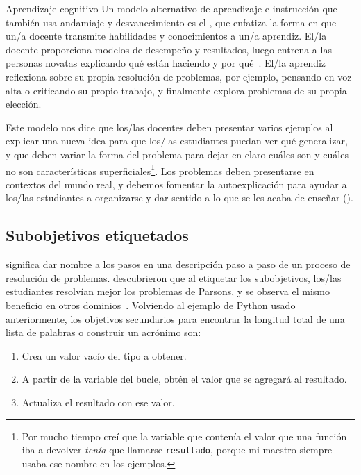 \begin{aside}{Aprendizaje cognitivo}
  Un modelo alternativo de aprendizaje e instrucción que también usa andamiaje y desvanecimiento
  es el ,
  que enfatiza la forma en que un/a docente transmite habilidades y conocimientos a un/a aprendiz.
  El/la docente proporciona modelos de desempeño y resultados,
  luego entrena a las personas novatas explicando qué están haciendo y por qué~\cite{Coll1991,Casp2007}.
  El/la aprendiz reflexiona sobre su propia resolución de problemas,
  por ejemplo, pensando en voz alta o criticando su propio trabajo,
  y finalmente explora problemas de su propia elección.

  Este modelo nos dice que
  los/las docentes deben presentar varios ejemplos al explicar una nueva idea
  para que los/las estudiantes puedan ver qué generalizar,
  y que deben variar la forma del problema para dejar en claro
  cuáles son y cuáles no son características superficiales\footnote{Por mucho tiempo
     creí que la variable que contenía el valor que una función iba a devolver
     \emph{tenía} que llamarse \texttt{resultado},
     porque mi maestro siempre usaba ese nombre en los ejemplos.}.    
  Los problemas deben presentarse en contextos del mundo real,
  y debemos fomentar la autoexplicación para ayudar a los/las estudiantes
  a organizarse y dar sentido a lo que se les acaba de enseñar
 ().
\end{aside}


\subsection*{Sub\-objetivos etiquetados}
 
 significa
dar nombre a los pasos en una descripción paso a paso de un proceso de resolución de problemas.
\cite{Marg2016,Morr2016} descubrieron que al etiquetar los sub\-objetivos, los/las estudiantes 
resolvían mejor los problemas de Parsons,
y se observa el mismo beneficio en otros dominios~\cite{Marg2012}.
Volviendo al ejemplo de Python usado anteriormente,
los objetivos secundarios para encontrar la longitud total de una lista de palabras o construir un acrónimo son:

\begin{enumerate}

\item
  Crea un valor vacío del tipo a obtener.

\item
  A partir de la variable del bucle, obtén el valor que se agregará al resultado.

\item
  Actualiza el resultado con ese valor.

\end{enumerate}

